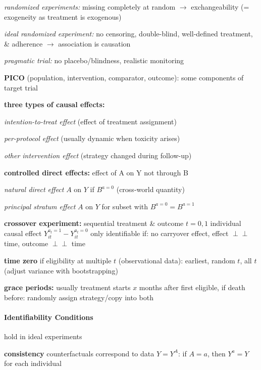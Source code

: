\documentclass[8pt,oneside]{extarticle}
\newcommand{\indep}{\perp \!\!\! \perp}
\begin{document}
\begin{multicols}{2}
\noindent \textit{randomized experiments:} missing completely at random $\rightarrow$ exchangeability (= exogeneity as treatment is exogenous)

\noindent \textit{ideal randomized experiment:} no censoring, double-blind, well-defined treatment, \& adherence $\rightarrow$ association is causation

\noindent \textit{pragmatic trial:} no placebo/blindness, realistic monitoring


\noindent \textbf{PICO} (population, intervention, comparator, outcome): some components of target trial

\noindent \textbf{three types of causal effects:}

\textit{intention-to-treat effect} (effect of treatment assignment)

\textit{per-protocol effect} (usually dynamic when toxicity arises)

\textit{other intervention effect} (strategy changed during follow-up)


\noindent \textbf{controlled direct effects:} effect of A on Y not through B

\textit{natural direct effect}  $A$ on $Y$ if $B^{a=0}$ (cross-world quantity)

\textit{principal stratum effect} $A$ on $Y$ for subset with $B^{a=0} = B^{a=1}$

\noindent \textbf{crossover experiment:} sequential treatment \& outcome $t{=}0,1$
\newline
individual causal effect $Y_{it}^{a_t=1} - Y_{it}^{a_t=0}$ only identifiable if: no carryover effect, effect $\indep$ time, outcome $\indep$ time

\noindent \textbf{time zero} if eligibility at multiple $t$ (observational data):
earliest, random $t$, all $t$ (adjust variance with bootstrapping)

\noindent \textbf{grace periods:} usually treatment starts $x$ months after first eligible, if death before: randomly assign strategy/copy into both




\paragraph{\large Identifiability Conditions} hold in ideal experiments

\noindent \textbf{consistency} counterfactuals correspond to data $Y=Y^A$: \newline
 if $A=a$, then $Y^a=Y$ for each individual
 

\end{multicols}
\end{document}
